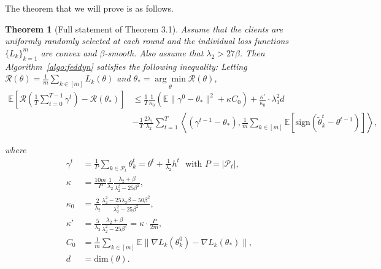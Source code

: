 \documentclass{article} %
\newtheorem{theorem}{Theorem}[section]
\begin{document}
The theorem that we will prove is as follows.
\begin{theorem}[Full statement of Theorem 3.1]\label{convergence_theorem}
Assume that the clients are uniformly randomly selected at each round and the individual loss functions $\{L_k\}_{k=1}^m$ are convex and $\beta$-smooth. Also assume that $\lambda_2>27\beta$. Then Algorithm~\ref{algo:feddyn} satisfies the following inequality: Letting $\mathcal{R}(\theta) = \frac{1}{m} \sum_{k \in [m]} L_k(\theta)$ and $    \theta_* =\underset{\theta}{\arg\min}\mathcal{R}(\theta)$,
\begin{align}
    \mathbb{E}\left[ \mathcal{R}\left( \frac{1}{T}\sum_{t=0}^{T-1}\gamma^t \right)-\mathcal{R}(\theta_*) \right]&\nonumber\le \frac{1}{T}\frac{1}{\kappa_0}(\mathbb{E}\lVert  \gamma^{0}-\theta_* \rVert^2+\kappa C_{0})+\frac{\kappa'}{\kappa_0} \cdot \lambda_1^2d\\
    &-\frac{1}{T}\frac{2\lambda_1}{\lambda_2 }\sum_{t=1}^T \left\langle({\gamma^{t-1}-\theta_*}),\frac{1}{m}\sum_{k\in [m]}\mathbb{E}[\mathrm{sign}(\tilde{\theta}_k^t-\theta^{t-1})]\right\rangle,
\end{align}

where
\begin{align*}
    \gamma^t &=\frac{1}{P}\sum_{k\in \mathcal{P}_t}\theta_k^t=\theta^t+\frac{1}{\lambda_2}h^t ~~~ \textrm{with } P = |\mathcal{P}_t|, \\
    \kappa &= \frac{10m}{P}\frac{1}{\lambda_2}\frac{\lambda_2+\beta}{\lambda_2^2-25\beta^2}, \\
    \kappa_0 &= \frac{2}{\lambda_2}\frac{\lambda_2^2-25\lambda_2\beta-50\beta^2}{\lambda_2^2-25\beta^2}, \\
    \kappa' &= \frac{5}{\lambda_2}\frac{\lambda_2+\beta}{\lambda_2^2-25\beta^2} = \kappa \cdot \frac{P}{2m}, \\
    C_0 &= \frac{1}{m}\sum_{k\in[m]}\mathbb{E}\lVert\nabla L_k(\theta_k^0)-\nabla L_k(\theta_*)\rVert, \\
    d &= \textrm{dim}(\theta).
\end{align*}
\end{theorem}
\end{document}
